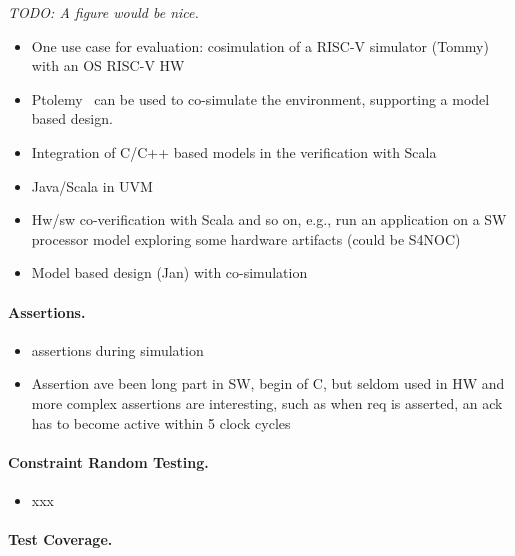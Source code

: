 \documentclass[fleqn,12pt]{article}
\newcommand{\todo}[1]{{\it TODO: #1}}
\begin{document}
\todo{A figure would be nice.}

\begin{itemize}
\item One use case for evaluation: cosimulation of a RISC-V simulator (Tommy) with an OS RISC-V HW 
\item Ptolemy~\cite{ptolemyII-book} can be used to co-simulate the environment, supporting a model based design.
\item Integration of C/C++ based models in the verification with Scala
\item Java/Scala in UVM
\item Hw/sw co-verification with Scala and so on, e.g., run an application on a SW processor model exploring some hardware artifacts (could be S4NOC)
\item Model based design (Jan) with co-simulation
\end{itemize}

\paragraph{Assertions.}

\begin{itemize}
\item assertions during simulation
\item Assertion ave been long part in SW, begin of C, but seldom used in HW and more complex assertions are interesting, such as when req is asserted, an ack has to become active within 5 clock cycles
\end{itemize}

\paragraph{Constraint Random Testing.}

\begin{itemize}
\item xxx
\end{itemize}


\paragraph{Test Coverage.}
\end{document}
